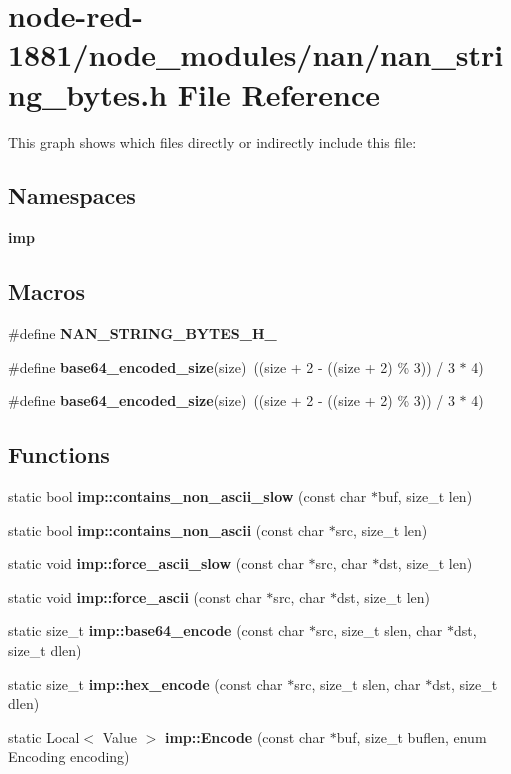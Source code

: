 \section{node-\/red-\/1881/node\+\_\+modules/nan/nan\+\_\+string\+\_\+bytes.h File Reference}
\label{nan__string__bytes_8h}
This graph shows which files directly or indirectly include this file\+:
\subsection*{Namespaces}
\begin{DoxyCompactItemize}
\item 
 \textbf{ imp}
\end{DoxyCompactItemize}
\subsection*{Macros}
\begin{DoxyCompactItemize}
\item 
\#define \textbf{ N\+A\+N\+\_\+\+S\+T\+R\+I\+N\+G\+\_\+\+B\+Y\+T\+E\+S\+\_\+\+H\+\_\+}
\item 
\#define \textbf{ base64\+\_\+encoded\+\_\+size}(size)~((size + 2 -\/ ((size + 2) \% 3)) / 3 $\ast$ 4)
\item 
\#define \textbf{ base64\+\_\+encoded\+\_\+size}(size)~((size + 2 -\/ ((size + 2) \% 3)) / 3 $\ast$ 4)
\end{DoxyCompactItemize}
\subsection*{Functions}
\begin{DoxyCompactItemize}
\item 
static bool \textbf{ imp\+::contains\+\_\+non\+\_\+ascii\+\_\+slow} (const char $\ast$buf, size\+\_\+t len)
\item 
static bool \textbf{ imp\+::contains\+\_\+non\+\_\+ascii} (const char $\ast$src, size\+\_\+t len)
\item 
static void \textbf{ imp\+::force\+\_\+ascii\+\_\+slow} (const char $\ast$src, char $\ast$dst, size\+\_\+t len)
\item 
static void \textbf{ imp\+::force\+\_\+ascii} (const char $\ast$src, char $\ast$dst, size\+\_\+t len)
\item 
static size\+\_\+t \textbf{ imp\+::base64\+\_\+encode} (const char $\ast$src, size\+\_\+t slen, char $\ast$dst, size\+\_\+t dlen)
\item 
static size\+\_\+t \textbf{ imp\+::hex\+\_\+encode} (const char $\ast$src, size\+\_\+t slen, char $\ast$dst, size\+\_\+t dlen)
\item 
static Local$<$ Value $>$ \textbf{ imp\+::\+Encode} (const char $\ast$buf, size\+\_\+t buflen, enum Encoding encoding)
\end{DoxyCompactItemize}


